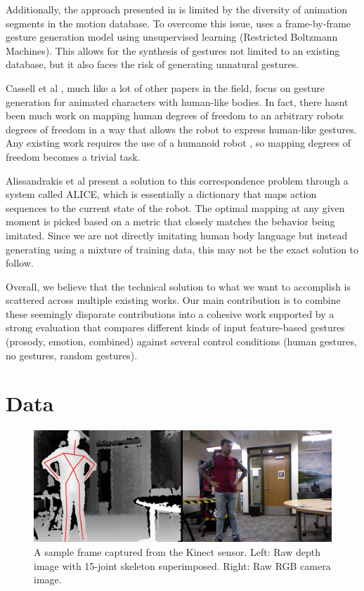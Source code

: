 Additionally, the approach presented in \cite{levine:2} is limited by the diversity of animation segments in the motion database. To overcome this issue, \cite{rbm:9} uses a frame-by-frame gesture generation model using unsupervised learning (Restricted Boltzmann Machines). This allows for the synthesis of gestures not limited to an existing database, but it also faces the risk of generating unnatural gestures.

Cassell et al \cite{cassell:4}, much like a lot of other papers in the field, focus on gesture generation for animated characters with human-like bodies. In fact, there hasn\textquotesingle t been much work on mapping human degrees of freedom to an arbitrary robot\textquotesingle s degrees of freedom in a way that allows the robot to express human-like gestures. Any existing work requires the use of a humanoid robot \cite{gestures:1} \cite{anotherone:5}, so mapping degrees of freedom becomes a trivial task.

Alissandrakis et al \cite{aliss:6} present a solution to this correspondence problem through a system called ALICE, which is essentially a dictionary that maps action sequences to the current state of the robot. The optimal mapping at any given moment is picked based on a metric that closely matches the behavior being imitated. Since we are not directly imitating human body language but instead generating using a mixture of training data, this may not be the exact solution to follow.

Overall, we believe that the technical solution to what we want to accomplish is scattered across multiple existing works. Our main contribution is to combine these seemingly disparate contributions into a cohesive work supported by a strong evaluation that compares different kinds of input feature-based gestures (prosody, emotion, combined) against several control conditions (human gestures, no gestures, random gestures).

\section{Data}
\begin{figure}
\includegraphics[scale=0.2]{sample_frame.jpg}
\caption{A sample frame captured from the Kinect sensor. Left: Raw depth image with 15-joint skeleton superimposed. Right: Raw RGB camera image.}
\label{fig:rawframe}
\end{figure}

